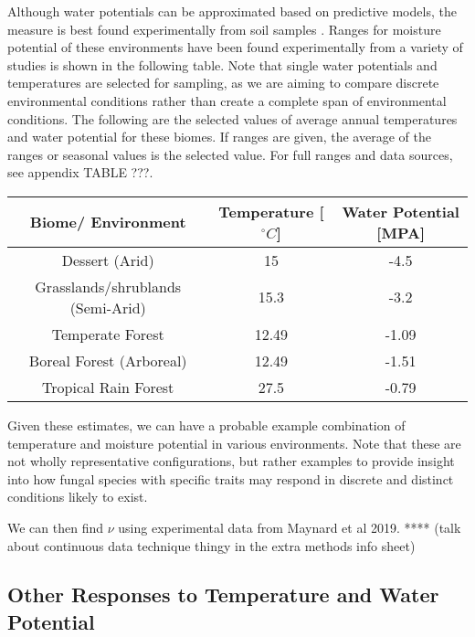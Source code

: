 \documentclass{article}
\begin{document}
Although water potentials can be approximated based on predictive models, the measure is best found experimentally from soil samples \cite{Abkenar2019}. Ranges for moisture potential of these environments have been found experimentally from a variety of studies is shown in the following table. Note that single water potentials and temperatures are selected for sampling, as we are aiming to compare discrete environmental conditions rather than create a complete span of environmental conditions. The following are the selected values of average annual temperatures and water potential for these biomes. If ranges are given, the average of the ranges or seasonal values is the selected value. For full ranges and data sources, see appendix TABLE ???.

\begin{table}[H]
\begin{center}
 \begin{tabular}{|c c c|} 
 \hline
 Biome/ Environment & Temperature [$^{\circ}C$] & Water Potential [MPA]\\ [0.5ex] 
 \hline\hline
 Dessert (Arid) & 15 & -4.5 \\ 
 \hline
 Grasslands/shrublands (Semi-Arid) &15.3 & -3.2\\
 \hline
 Temperate Forest & 12.49 & -1.09 \\
 \hline
 Boreal Forest (Arboreal)& 12.49 &  -1.51 \\
 \hline
 Tropical Rain Forest & 27.5 & -0.79 \\
 \hline
\end{tabular}
\end{center}
\end{table}


Given these estimates, we can have a probable example combination of temperature and moisture potential in various environments. Note that these are not wholly representative configurations, but rather examples to provide insight into how fungal species with specific traits may respond in discrete and distinct conditions likely to exist. 

We can then find $\nu$ using experimental data from Maynard et al 2019. **** (talk about continuous data technique thingy in the extra methods info sheet)


\subsection{Other Responses to Temperature and Water Potential}
\end{document}
